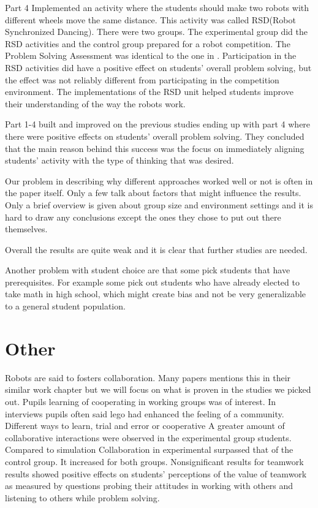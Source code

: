 \bigskip\noindent
Part 4 Implemented an activity where the students should make two robots with different wheels move the same distance. This activity was called RSD(Robot Synchronized Dancing). There were two groups. The experimental group did the RSD activities and the control group prepared for a robot competition. The Problem Solving Assessment was identical to the one in \cite{silk2011resources}. Participation in the RSD activities did have a positive effect on students’ overall problem solving, but the effect was not reliably different from participating in the competition environment. The implementations of the RSD unit helped students improve their understanding of the way the robots work. 

\bigskip\noindent
Part 1-4 built and improved on the previous studies ending up with part 4 where there were positive effects on students’ overall problem solving. They concluded that the main reason behind this success was the focus on immediately aligning students’ activity with the type of thinking that was desired.

\bigskip\noindent
Our problem in describing why different approaches worked well or not is often in the paper itself. Only a few talk about factors that might influence the results. Only a brief overview is given about group size and environment settings and it is hard to draw any conclusions except the ones they chose to put out there themselves. 

\bigskip\noindent
Overall the results are quite weak and it is clear that further studies are needed.

\bigskip\noindent
Another problem with student choice are that some pick students that have prerequisites. For example some pick out students who have already elected to take math in high school, which might create bias and not be very generalizable to a general student population.

\section{Other}
Robots are said to fosters collaboration. Many papers mentions this in their similar work chapter but we will focus on what is proven in the studies we picked out.
\cite{lindh2007does} Pupils learning of cooperating in working groups was of interest. In interviews pupils often said lego had enhanced the feeling of a community. Different ways to learn, trial and error or cooperative
\cite{mitnik2009collaborative} A greater amount of collaborative interactions were observed in the experimental group students. Compared to simulation
\cite{mitnik2009collaborative} Collaboration in experimental surpassed that of the control group. It increased for both groups.
\cite{nugent2009use} Nonsignificant results for teamwork 
\cite{nugent2008effect} results showed positive effects on students’ perceptions of the value of teamwork as measured by questions probing their attitudes in working with others and listening to others while problem solving. 


